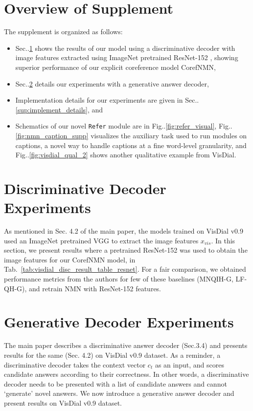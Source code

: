 \documentclass[runningheads]{llncs}
\makeatletter
\DeclareRobustCommand\onedot{\futurelet\@let@token\@onedot}
\def\@onedot{\ifx\@let@token.\else.\null\fi\xspace}
\def\Fig{Fig\onedot}
\def\Sec{Sec\onedot}
\newcommand{\nmn}{CorefNMN\xspace}
\newcommand{\reftab}[1]{Tab.~\ref{#1}}
\newcommand{\myparagraph}[1]{\vspace{0pt}\noindent{\bf #1}}
\makeatother
\begin{document}
\section*{Overview of Supplement}
The supplement is organized as follows:
\begin{itemize}
\setlength\itemsep{1em}
\item \Sec\ref{sup:disc_results} shows the results of our model using a 
	discriminative decoder with image features extracted using ImageNet 
    pretrained ResNet-152 \cite{he16cvpr},
    showing superior performance of our 
	explicit coreference model \nmn,
\item \Sec\ref{sup:gen_results} details our experiments with a generative 
	answer decoder,
\item Implementation details for our experiments are given in 
	\Sec\ref{sup:implement_details}, and
\item Schematics of our novel \texttt{Refer} module are in 
	\Fig\ref{fig:refer_visual}, \Fig\ref{fig:nmn_caption_supp} visualizes 
    the auxiliary task used to run modules on captions, a novel way to handle 
    captions at a fine word-level granularity, and \Fig\ref{fig:visdial_qual_2}
    shows another qualitative example from VisDial.
\end{itemize}

\section{Discriminative Decoder Experiments}
\label{sup:disc_results}
\myparagraph{Comparisons with ResNet-152 features.}
As mentioned in Sec. 4.2 of the main paper, the models trained on
VisDial v0.9 used an ImageNet pretrained VGG \cite{simonyan_iclr15} to extract
the image features $x_{vis}$.
In this section, we present results where a pretrained ResNet-152 \cite{he16cvpr}
was used to obtain the image features for our \nmn model, in \reftab{tab:visdial_disc_result_table_resnet}.
For a fair comparison, we obtained performance metrics from the authors for few
of these baselines (MNQIH-G, LF-QH-G), and retrain NMN with ResNet-152 features.


\section{Generative Decoder Experiments}
\label{sup:gen_results}

The main paper describes a discriminative answer decoder (Sec.3.4) and presents results for the same (Sec. 4.2) on VisDial v0.9 dataset.
As a reminder, a discriminative decoder takes the context vector $c_t$ as an input, and scores candidate answers according to their correctness.
In other words, a discriminative decoder needs to be presented with a list of
candidate answers and cannot `generate' novel answers.
We now introduce a generative answer decoder and present results on VisDial 
v0.9 dataset.
\end{document}
